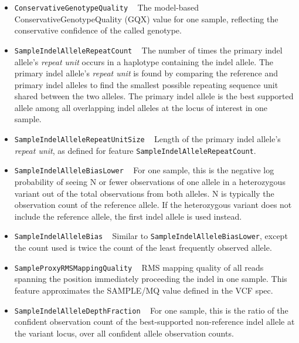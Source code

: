 \documentclass{article}
\begin{document}
\begin{itemize}
\item \texttt{ConservativeGenotypeQuality} ~ The model-based ConservativeGenotypeQuality (GQX) value for one sample, reflecting the conservative confidence of the called genotype.

\item \texttt{SampleIndelAlleleRepeatCount} ~ The number of times the primary indel allele's \emph{repeat unit} occurs in a haplotype containing the indel allele. The primary indel allele's \emph{repeat unit} is found by comparing the reference and primary indel alleles to find the smallest possible repeating sequence unit shared between the two alleles. The primary indel allele is the best supported allele among all overlapping indel alleles at the locus of interest in one sample.

\item \texttt{SampleIndelAlleleRepeatUnitSize} ~ Length of the primary indel allele's \emph{repeat unit}, as defined for feature \texttt{SampleIndelAlleleRepeatCount}.

\item \texttt{SampleIndelAlleleBiasLower} ~ For one sample, this is the negative log probability of seeing N or fewer observations of one allele in a heterozygous variant out of the total observations from both alleles. N is typically the observation count of the reference allele. If the heterozygous variant does not include the reference allele, the first indel allele is used instead.

\item \texttt{SampleIndelAlleleBias} ~ Similar to \texttt{SampleIndelAlleleBiasLower}, except the count used is twice the count of the least frequently observed allele.

\item \texttt{SampleProxyRMSMappingQuality} ~ RMS mapping quality of all reads spanning the position immediately proceeding the indel in one sample. This feature approximates the SAMPLE/MQ value defined in the VCF spec.

\item \texttt{SampleIndelAlleleDepthFraction} ~ For one sample, this is the ratio of the confident observation count of the best-supported non-reference indel allele at the variant locus, over all confident allele observation counts.

\end{itemize}




\end{document}
